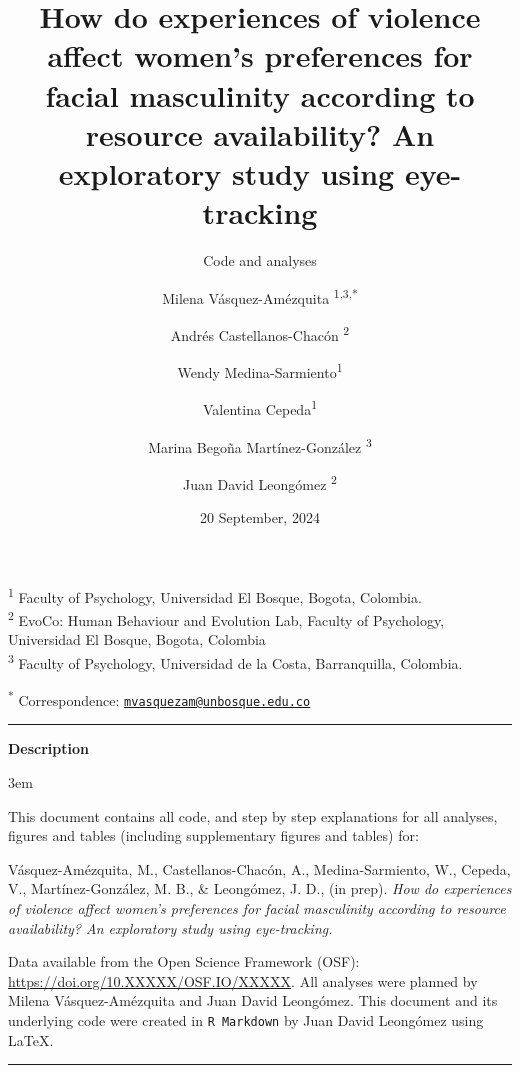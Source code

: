 \documentclass[
  bookmarksnumbered]{article}
\title{How do experiences of violence affect women's preferences for facial masculinity according to resource availability? An exploratory study using eye-tracking}
\subtitle{Code and analyses}
\author{Milena Vásquez-Amézquita \orcidlink{0000-0001-7317-8430}\textsuperscript{1,3,*} \and Andrés Castellanos-Chacón \orcidlink{0000-0003-1684-9319}\textsuperscript{2} \and Wendy Medina-Sarmiento\textsuperscript{1} \and Valentina Cepeda\textsuperscript{1} \and Marina Begoña Martínez-González \orcidlink{0000-0002-5840-6383}\textsuperscript{3} \and Juan David Leongómez \orcidlink{0000-0002-0092-6298}\textsuperscript{2}}
\date{20 September, 2024}
\begin{document}
\maketitle

\textsuperscript{1} Faculty of Psychology, Universidad El Bosque, Bogota, Colombia.\\
\textsuperscript{2} EvoCo: Human Behaviour and Evolution Lab, Faculty of Psychology, Universidad El Bosque, Bogota, Colombia\\
\textsuperscript{3} Faculty of Psychology, Universidad de la Costa, Barranquilla, Colombia.

\textsuperscript{*} Correspondence: \href{mailto:mvasquezam@unbosque.edu.co}{\href{mailto:mvasquezam@unbosque.edu.co}{\nolinkurl{mvasquezam@unbosque.edu.co}}}

\begin{center}\rule{0.5\linewidth}{0.5pt}\end{center}

\begin{center}
\textbf{Description}
\end{center}

\par
\begingroup
\leftskip3em
\rightskip\leftskip

This document contains all code, and step by step explanations for all analyses, figures and tables (including supplementary figures and tables) for:

\begin{hangparas}{.25in}{1}
Vásquez-Amézquita, M., Castellanos-Chacón, A., Medina-Sarmiento, W., Cepeda, V., Martínez-González, M. B., \& Leongómez, J. D.,  (in prep). \textit{How do experiences of violence affect women's preferences for facial masculinity according to resource availability? An exploratory study using eye-tracking.}
\end{hangparas}

Data available from the Open Science Framework (OSF): \url{https://doi.org/10.XXXXX/OSF.IO/XXXXX}. All analyses were planned by Milena Vásquez-Amézquita and Juan David Leongómez. This document and its underlying code were created in \texttt{R\ Markdown} by Juan David Leongómez using \LaTeX.

\begin{center}\rule{0.5\linewidth}{0.5pt}\end{center}

\par
\endgroup

{\hypersetup{hidelinks}
\setcounter{tocdepth}{6}
\tableofcontents
}
\opensupplement
\end{document}
